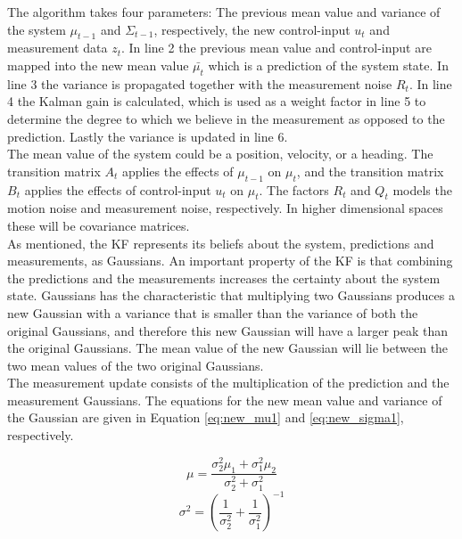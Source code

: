 The algorithm takes four parameters: The previous mean value and variance of the system $\mu_{t-1}$ and $\Sigma_{t-1}$, respectively, the new control-input $u_{t}$ and measurement data $z_{t}$. In line 2 the previous mean value and control-input are mapped into the new mean value $\bar{\mu_{t}}$ which is a prediction of the system state. In line 3 the variance is propagated together with the measurement noise $R_{t}$. In line 4 the Kalman gain is calculated, which is used as a weight factor in line 5 to determine the degree to which we believe in the measurement as opposed to the prediction. Lastly the variance is updated in line 6.\\

The mean value of the system could be a position, velocity, or a heading. The transition matrix $A_{t}$ applies the effects of $\mu_{t-1}$ on $\mu_{t}$, and the transition matrix $B_{t}$ applies the effects of control-input $u_{t}$ on $\mu_{t}$. The factors $R_{t}$ and $Q_{t}$ models the motion noise and measurement noise, respectively. In higher dimensional spaces these will be covariance matrices.\\

As mentioned, the KF represents its beliefs about the system, predictions and measurements, as Gaussians. An important property of the KF is that combining the predictions and the measurements increases the certainty about the system state. Gaussians has the characteristic that multiplying two Gaussians produces a new Gaussian with a variance that is smaller than the variance of both the original Gaussians, and therefore this new Gaussian will have a larger peak than the original Gaussians. The mean value of the new Gaussian will lie between the two mean values of the two original Gaussians. \\

The measurement update consists of the multiplication of the prediction and the measurement Gaussians. The equations for the new mean value and variance of the Gaussian are given in Equation \ref{eq:new_mu1} and \ref{eq:new_sigma1}, respectively.

\begin{equation}
\label{eq:new_mu1}
\mu = \dfrac{\sigma_{2}^2\mu_{1} + \sigma_{1}^2\mu_{2}}{\sigma_{2}^2 + \sigma_{1}^2}
\end{equation}
\begin{equation}
\label{eq:new_sigma1}
\sigma^2 = \left(\dfrac{1}{\sigma_{2}^2} + \dfrac{1}{\sigma_{1}^2}\right)^{-1}
\end{equation}

